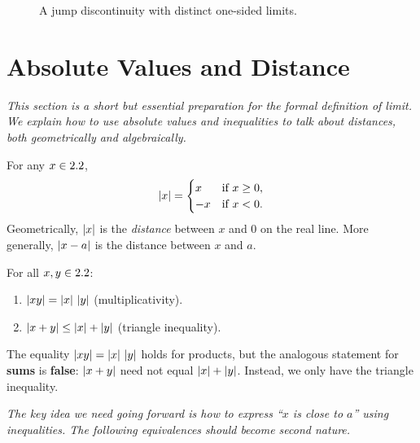 \begin{figure}[ht]
  \centering
  
  \caption{A jump discontinuity with distinct one-sided limits.}
  \label{fig:one-sided-jump}
\end{figure}

\section{Absolute Values and Distance}
\label{sec:2.4}

\textit{This section is a short but essential preparation for the formal definition of limit.  We explain how to use absolute values and inequalities to talk about distances, both geometrically and algebraically.}

\begin{definition}
\label{def:2-1}
For any $x \in 2.2$,
\[
  \left\lvert x \right\rvert =
  \begin{cases}
    x & \text{if } x \geq 0, \\
    -x & \text{if } x < 0.
  \end{cases}
\]
Geometrically, $\left\lvert x \right\rvert$ is the \emph{distance} between $x$ and $0$ on the real line.  More generally, $\left\lvert x - a \right\rvert$ is the distance between $x$ and $a$.
\end{definition}

\begin{theorem}
\label{thm:2-1}
For all $x, y \in 2.2$:
\begin{enumerate}[label=(\roman*)]
  \item $\left\lvert xy \right\rvert = \left\lvert x \right\rvert\,\left\lvert y \right\rvert$ \quad (multiplicativity).
  \item $\left\lvert x + y \right\rvert \leq \left\lvert x \right\rvert + \left\lvert y \right\rvert$ \quad (triangle inequality).
\end{enumerate}
\end{theorem}

\begin{remark}[Warning]
The equality $\left\lvert xy \right\rvert = \left\lvert x \right\rvert\,\left\lvert y \right\rvert$ holds for products, but the analogous statement for \textbf{sums} is \textbf{false}: $\left\lvert x+y \right\rvert$ need not equal $\left\lvert x \right\rvert+\left\lvert y \right\rvert$.  Instead, we only have the triangle inequality.
\end{remark}

\textit{The key idea we need going forward is how to express ``$x$ is close to $a$'' using inequalities.  The following equivalences should become second nature.}

